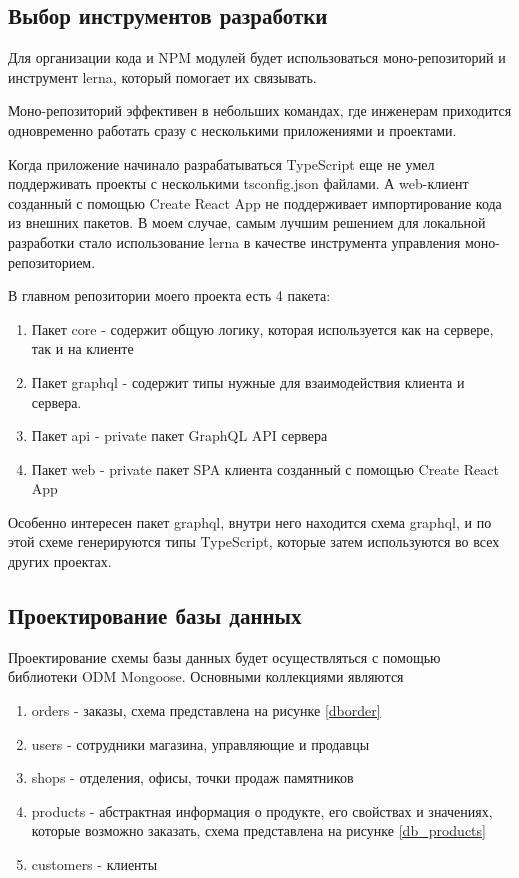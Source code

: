 \documentclass[a4paper,article,14pt]{extarticle}
\begin{document}
\subsection{Выбор инструментов разработки}

Для организации кода и NPM модулей будет использоваться моно-репозиторий и инструмент lerna,
который помогает их связывать.

Моно-репозиторий эффективен в небольших командах, где инженерам приходится одновременно работать 
сразу с несколькими приложениями и проектами.

Когда приложение начинало разрабатываться TypeScript еще не умел поддерживать проекты с несколькими tsconfig.json файлами.
А web-клиент созданный с помощью Create React App не поддерживает импортирование кода из внешних пакетов.
В моем случае, самым лучшим решением для локальной разработки стало 
использование lerna в качестве инструмента управления моно-репозиторием.

В главном репозитории моего проекта есть 4 пакета:

\begin{enumerate}
    \item Пакет core - содержит общую логику, которая используется как на сервере, так и на клиенте
    \item Пакет graphql - содержит типы нужные для взаимодействия клиента и сервера.
    \item Пакет api - private пакет GraphQL API сервера
    \item Пакет web - private пакет SPA клиента созданный с помощью Create React App
\end{enumerate}

Особенно интересен пакет graphql, внутри него находится схема graphql, и по этой схеме генерируются типы TypeScript, 
которые затем используются во всех других проектах.

\pagebreak

\subsection{Проектирование базы данных}

Проектирование схемы базы данных будет осуществляться с помощью библиотеки ODM Mongoose.
Основными коллекциями являются

\begin{enumerate}
    \item orders - заказы, схема представлена на рисунке \ref{dborder}
    \item users - сотрудники магазина, управляющие и продавцы
    \item shops - отделения, офисы, точки продаж памятников
    \item products - абстрактная информация о продукте, его свойствах и значениях, которые возможно заказать,
    схема представлена на рисунке \ref{db_products}
    \item customers - клиенты
\end{enumerate}
\end{document}
